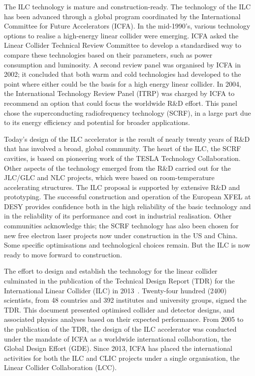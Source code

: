 The ILC technology is mature and construction-ready.   The technology
of the ILC has been advanced through a global program coordinated by
the International Committee for Future Accelerators
(ICFA).
In the mid-1990's, various technology options to
realise a high-energy linear collider were emerging. 
ICFA asked the 
Linear Collider Technical Review Committee to develop a standardised
way to  compare  these  technologies based on their parameters, such as
power consumption and luminosity. A second
review panel was organised by ICFA in 2002;
it concluded that both warm and cold technologies had
developed to the point where either could be the basis for a
high energy linear
collider. In 2004, the  International Technology Review Panel
(ITRP) was charged by ICFA to recommend an option that could focus the
worldwide R\&D effort.  This panel chose the  superconducting
radiofrequency technology (SCRF), in a large part due to its
energy efficiency and potential for broader applications. 

Today's design of the ILC accelerator is the result of 
nearly twenty years of
R\&D that has involved a broad, global community. 
The heart of the ILC, the SCRF cavities, is based on
pioneering work of the TESLA Technology Collaboration. Other aspects of the 
technology
emerged from the R\&D carried out for the JLC/GLC and NLC projects,
which were based on room-temperature accelerating structures. 
The ILC proposal
is supported by extensive R\&D and prototyping. The successful construction and
operation 
of the European XFEL at DESY provides
confidence both in the high reliability of the basic
technology and in the reliability of its performance and cost in 
industrial realisation.  Other communities acknowledge this; the SCRF 
 technology has also been chosen for new
free electron laser projects now under construction in the US and China.
Some specific optimisations and technological choices remain.
But the ILC is now ready to move forward to construction. 

The effort to design and
establish the technology for the linear collider culminated in the
publication of the Technical Design Report (TDR) for the International
Linear Collider (ILC) in 2013~\cite{Behnke:2013xla}. 
Twenty-four hundred (2400) scientists, from 48 countries and 
392 institutes and university
groups,
 signed the TDR.  This document
presented optimised collider and detector designs, and associated 
physics analyses based on their  expected performance.
From
2005 to the publication of the TDR, the
design of the ILC accelerator was conducted under the mandate of ICFA
as a worldwide
international collaboration, the Global Design Effort (GDE). 
Since 2013, ICFA has placed the  international activities for both the ILC and CLIC
projects under a single organisation, 
the Linear Collider Collaboration (LCC).


